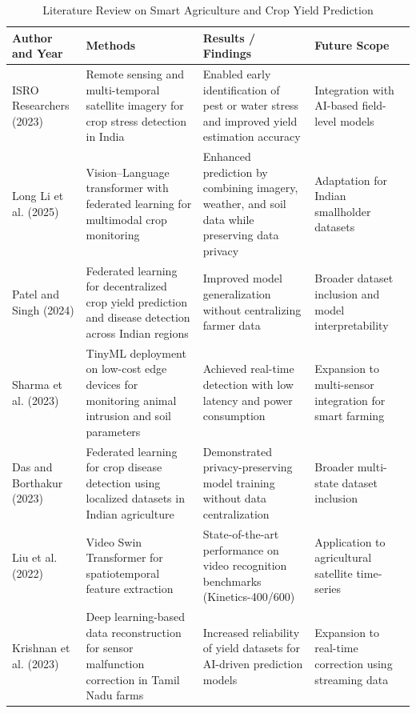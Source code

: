 \documentclass[12pt,a4paper]{report}
\begin{document}
\newpage
\begin{table}[H]
    \caption{Literature Review on Smart Agriculture and Crop Yield Prediction}
    \centering
    \begin{tabular}{|p{3cm}|p{5.5cm}|p{3.5cm}|p{2.5cm}|}
    \hline
    \textbf{Author and Year} & \textbf{Methods} & \textbf{Results / Findings} & \textbf{Future Scope} \\
    \hline
    ISRO Researchers \cite{isro2023bhuvan} (2023) & Remote sensing and multi-temporal satellite imagery for crop stress detection in India & Enabled early identification of pest or water stress and improved yield estimation accuracy & Integration with AI-based field-level models \\
    \hline
    Long Li et al. \cite{li2025vision} (2025) & Vision--Language transformer with federated learning for multimodal crop monitoring & Enhanced prediction by combining imagery, weather, and soil data while preserving data privacy & Adaptation for Indian smallholder datasets \\
    \hline
    Patel and Singh \cite{patel2024imputation} (2024) & Federated learning for decentralized crop yield prediction and disease detection across Indian regions & Improved model generalization without centralizing farmer data & Broader dataset inclusion and model interpretability \\
    \hline
    Sharma et al. \cite{sharma2023integrating} (2023) & TinyML deployment on low-cost edge devices for monitoring animal intrusion and soil parameters & Achieved real-time detection with low latency and power consumption & Expansion to multi-sensor integration for smart farming \\
    \hline
    Das and Borthakur \cite{das2023federated} (2023) & Federated learning for crop disease detection using localized datasets in Indian agriculture & Demonstrated privacy-preserving model training without data centralization & Broader multi-state dataset inclusion \\
    \hline
    Liu et al. \cite{liu2022swin3d} (2022) & Video Swin Transformer for spatiotemporal feature extraction & State-of-the-art performance on video recognition benchmarks (Kinetics-400/600) & Application to agricultural satellite time-series \\
    \hline
    Krishnan et al. \cite{krishnan2023reconstruction} (2023) & Deep learning-based data reconstruction for sensor malfunction correction in Tamil Nadu farms & Increased reliability of yield datasets for AI-driven prediction models & Expansion to real-time correction using streaming data \\
    \hline
    \end{tabular}
    \label{tab:lit_review_agri}
\end{table}
\end{document}
